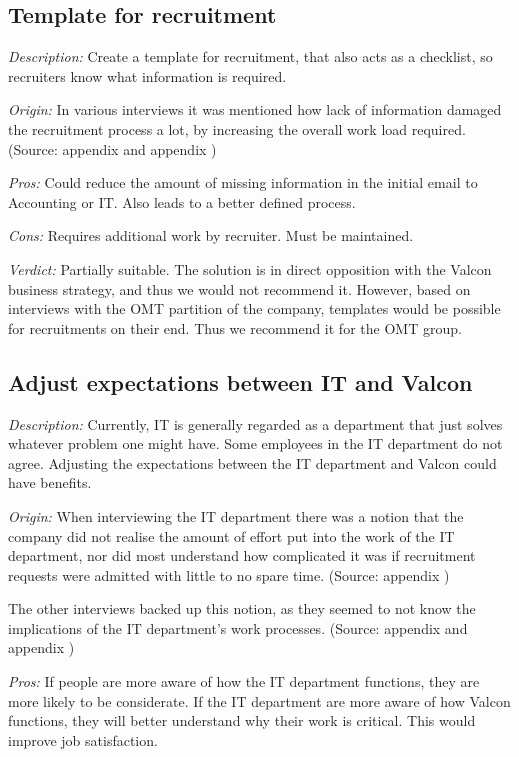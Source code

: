 \subsection{Template for recruitment}
\emph{Description:} Create a template for recruitment, that also acts as a checklist, so recruiters know what information is required.

\emph{Origin:}
In various interviews it was mentioned how lack of information damaged the recruitment process a lot, by increasing the overall work load required.
(Source: appendix  and appendix )

 \emph{Pros:} Could reduce the amount of missing information in the initial email to Accounting or IT. 
Also leads to a better defined process.

 \emph{Cons:} Requires additional work by recruiter.
Must be maintained.

\emph{Verdict:}
Partially suitable. The solution is in direct opposition with the Valcon business strategy, and thus we would not recommend it. However, based on interviews with the OMT partition of the company, templates would be possible for recruitments on their end. Thus we recommend it for the OMT group.

\subsection{Adjust expectations between IT and Valcon}
\emph{Description:} Currently, IT is generally regarded as a department that just solves whatever problem one might have. Some employees in the IT department do not agree. Adjusting the expectations between the IT department and Valcon could have benefits.

\emph{Origin:}
When interviewing the IT department there was a notion that the company did not realise the amount of effort put into the work of the IT department, nor did most understand how complicated it was if recruitment requests were admitted with little to no spare time.
(Source: appendix )

The other interviews backed up this notion, as they seemed to not know the implications of the IT department's work processes.
(Source: appendix  and appendix )

 \emph{Pros:}
If people are more aware of how the IT department functions, they are more likely to be considerate. If the IT department are more aware of how Valcon functions, they will better understand why their work is critical. This would improve job satisfaction.

